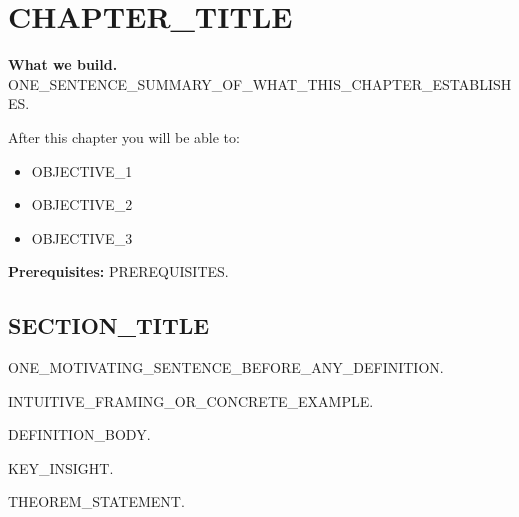 
\chapter{CHAPTER\_TITLE}
\label{ch:LABEL}

\begin{roadmap}
\textbf{What we build.}
ONE_SENTENCE_SUMMARY_OF_WHAT_THIS_CHAPTER_ESTABLISHES.

After this chapter you will be able to:
\begin{itemize}[noitemsep]
  \item OBJECTIVE_1
  \item OBJECTIVE_2
  \item OBJECTIVE_3
\end{itemize}

\textbf{Prerequisites:} PREREQUISITES.
\end{roadmap}

\section{SECTION\_TITLE}
\label{sec:LABEL_sec1}

ONE_MOTIVATING_SENTENCE_BEFORE_ANY_DEFINITION.

\begin{intuition}
INTUITIVE\_FRAMING\_OR\_CONCRETE\_EXAMPLE.
\end{intuition}

\begin{definition}
\label{def:LABEL}
DEFINITION_BODY.
\end{definition}

\begin{keyidea}
KEY_INSIGHT.
\end{keyidea}

\begin{theorem}
\label{thm:LABEL}
THEOREM_STATEMENT.
\end{theorem}

